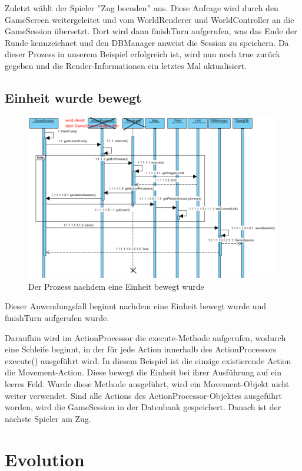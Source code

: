 \documentclass[fontsize=12pt,paper=a4,twoside]{scrartcl}
\begin{document}
Zuletzt wählt der Spieler ''Zug beenden'' aus. Diese Anfrage wird durch den GameScreen weitergeleitet und vom WorldRenderer und WorldController an die GameSession übersetzt. Dort wird dann finishTurn aufgerufen, was das Ende der Runde kennzeichnet und den DBManager anweist die Session zu speichern. Da dieser Prozess in unserem Beispiel erfolgreich ist, wird nun noch true zurück gegeben und die Render-Informationen ein letztes Mal aktualisiert.


\subsection{Einheit wurde bewegt}

\begin{figure}[h]
\centering
\includegraphics[width=1.0\linewidth]{sequenz2}
\caption{Der Prozess nachdem eine Einheit bewegt wurde}
\label{fig:sequenz2}
\end{figure}

Dieser Anwendungsfall beginnt nachdem eine Einheit bewegt wurde und finishTurn aufgerufen wurde. 

Daraufhin wird im ActionProcessor die execute-Methode aufgerufen, wodurch eine Schleife beginnt, in der für jede Action innerhalb des ActionProcessors execute() ausgeführt wird. In diesem Beispiel ist die einzige existierende Action die Movement-Action. Diese bewegt die Einheit bei ihrer Ausführung auf ein leeres Feld. Wurde diese Methode ausgeführt, wird ein Movement-Objekt nicht weiter verwendet. Sind alle Actions des ActionProcessor-Objektes ausgeführt worden, wird die GameSession in der Datenbank gespeichert. Danach ist der nächste Spieler am Zug.


\section{Evolution}
\end{document}

